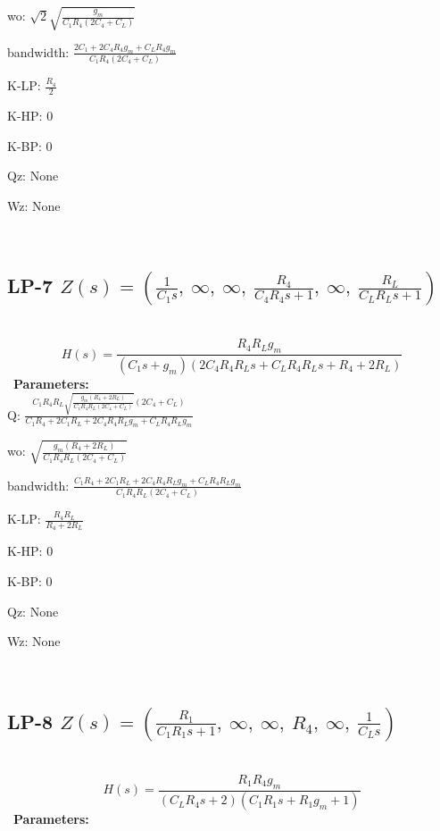 \documentclass{article}
\begin{document}
wo: $\sqrt{2} \sqrt{\frac{g_{m}}{C_{1} R_{4} \left(2 C_{4} + C_{L}\right)}}$\ 

bandwidth: $\frac{2 C_{1} + 2 C_{4} R_{4} g_{m} + C_{L} R_{4} g_{m}}{C_{1} R_{4} \left(2 C_{4} + C_{L}\right)}$\ 

K-LP: $\frac{R_{4}}{2}$\ 

K-HP: $0$\ 

K-BP: $0$\ 

Qz: $\text{None}$\ 

Wz: $\text{None}$\ 

\ 

\subsection{LP-7 $Z(s) = \left( \frac{1}{C_{1} s}, \  \infty, \  \infty, \  \frac{R_{4}}{C_{4} R_{4} s + 1}, \  \infty, \  \frac{R_{L}}{C_{L} R_{L} s + 1}\right)$ } \ 
\textbf{\[H(s) = \frac{R_{4} R_{L} g_{m}}{\left(C_{1} s + g_{m}\right) \left(2 C_{4} R_{4} R_{L} s + C_{L} R_{4} R_{L} s + R_{4} + 2 R_{L}\right)}\] } \ 
\textbf{Parameters:}\\ 

Q: $\frac{C_{1} R_{4} R_{L} \sqrt{\frac{g_{m} \left(R_{4} + 2 R_{L}\right)}{C_{1} R_{4} R_{L} \left(2 C_{4} + C_{L}\right)}} \left(2 C_{4} + C_{L}\right)}{C_{1} R_{4} + 2 C_{1} R_{L} + 2 C_{4} R_{4} R_{L} g_{m} + C_{L} R_{4} R_{L} g_{m}}$\ 

wo: $\sqrt{\frac{g_{m} \left(R_{4} + 2 R_{L}\right)}{C_{1} R_{4} R_{L} \left(2 C_{4} + C_{L}\right)}}$\ 

bandwidth: $\frac{C_{1} R_{4} + 2 C_{1} R_{L} + 2 C_{4} R_{4} R_{L} g_{m} + C_{L} R_{4} R_{L} g_{m}}{C_{1} R_{4} R_{L} \left(2 C_{4} + C_{L}\right)}$\ 

K-LP: $\frac{R_{4} R_{L}}{R_{4} + 2 R_{L}}$\ 

K-HP: $0$\ 

K-BP: $0$\ 

Qz: $\text{None}$\ 

Wz: $\text{None}$\ 

\ 

\subsection{LP-8 $Z(s) = \left( \frac{R_{1}}{C_{1} R_{1} s + 1}, \  \infty, \  \infty, \  R_{4}, \  \infty, \  \frac{1}{C_{L} s}\right)$ } \ 
\textbf{\[H(s) = \frac{R_{1} R_{4} g_{m}}{\left(C_{L} R_{4} s + 2\right) \left(C_{1} R_{1} s + R_{1} g_{m} + 1\right)}\] } \ 
\textbf{Parameters:}\\ 
\end{document}
